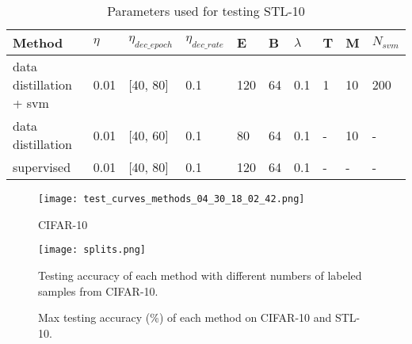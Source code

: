 \documentclass{article}
\begin{document}
\begin{table}[!ht]
  \caption{Parameters used for testing STL-10}
  \label{stl_params}
  \renewcommand{\arraystretch}{1.5}
\begin{tabularx}{0.97\textwidth}{M{2.5cm}|M{0.5cm}|M{1.5cm}|M{1.2cm}|M{0.5cm}|M{0.5cm}|M{0.5cm}|M{0.5cm}|M{0.5cm}|M{0.75cm}}
\toprule
  \textbf{Method} & $\eta$ & $\eta_{dec\_epoch}$\footnotemark[\value{footnote}]  &  $\eta_{dec\_rate}$ & E & B & $\lambda$ & T & M & $N_{svm}$\\
\hline
data distillation + svm & 0.01 & [40, 80] & 0.1  & 120 & 64 & 0.1 & 1 & 10 & 200\\
data distillation & 0.01& [40, 60] & 0.1 & 80 & 64  & 0.1 & - & 10 & -\\
supervised & 0.01 & [40, 80] & 0.1 & 120 & 64  & 0.1 & - & - & -\\
\bottomrule
\end{tabularx}
\end{table}

\begin{figure}
    \centering
    \texttt{[image: test\_curves\_methods\_04\_30\_18\_02\_42.png]}
    \caption{CIFAR-10}
    \label{test_curves}
\end{figure}

\begin{figure}
\centering
\begin{minipage}{0.49\textwidth}
\centering
\texttt{[image: splits.png]}
\caption{Testing accuracy of each method with different numbers of labeled samples from CIFAR-10.}
\label{splits}
\end{minipage}\hspace{0.1cm}
\begin{minipage}{0.49\textwidth}
\captionsetup{type=table}
\centering
{}
\caption{Max testing accuracy (\%) of each method on CIFAR-10 and STL-10.}
\label{both_datasets}
\end{minipage}
\end{figure}
\end{document}
